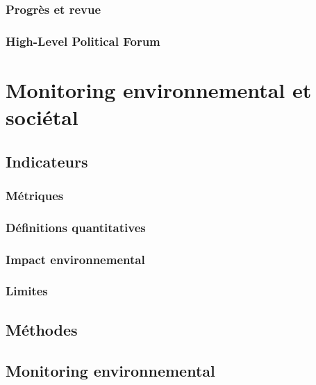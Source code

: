 \documentclass[10pt, conference, compsocconf]{llncs}
\begin{document}
\subsubsection{Progrès et revue}
\subsubsection{High-Level Political Forum}

\section{Monitoring environnemental et sociétal}
\subsection{Indicateurs}
\subsubsection{Métriques}
\subsubsection{Définitions quantitatives}
\subsubsection{Impact environnemental}			
\subsubsection{Limites}
\subsection{Méthodes}

\subsection{Monitoring environnemental}
\end{document}
